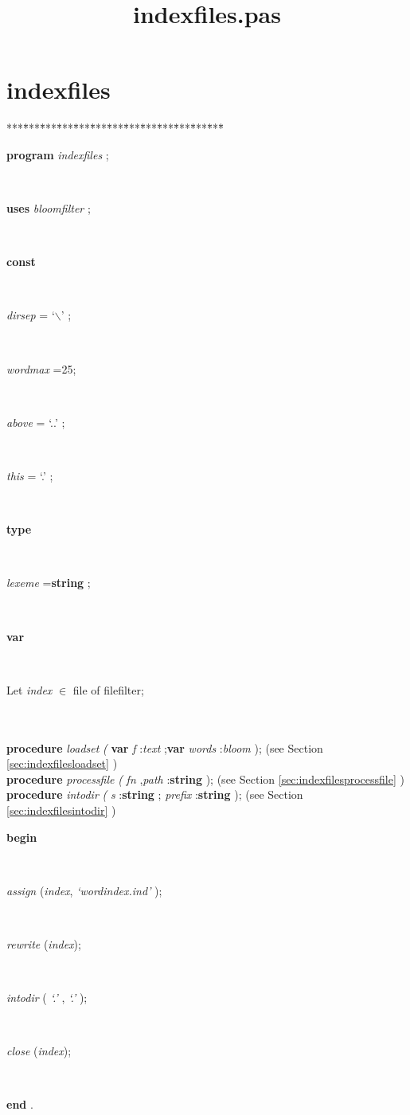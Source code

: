 \documentclass[10pt, a4paper]{article}
\title{indexfiles.pas}
\begin{document}
\maketitle

\tableofcontents
\section{indexfiles}
\begin{tabbing}
***\=***\=***\=***\=***\=***\=***\=***\=***\=***\=***\=***\=***\=\kill
\parbox{14cm}{\textsf{\textbf{program}  \textit{indexfiles} ;}}\\
\+\parbox{14cm}{\textsf{\textbf{uses}  \textit{bloomfilter} ;}}\\
\<\parbox{14cm}{\textsf{\textbf{const} }}\\
\parbox{14cm}{\textsf{\textit{dirsep} =\textrm{\textup { `$ \backslash $' } };}}\\
\parbox{14cm}{\textsf{\textit{wordmax} =25;}}\\
\parbox{14cm}{\textsf{\textit{above} =\textrm{\textup { `..' } };}}\\
\parbox{14cm}{\textsf{\textit{this} =\textrm{\textup { `.' } };}}\\
\<\parbox{14cm}{\textsf{\textbf{type} }}\\
\parbox{14cm}{\textsf{\textit{lexeme} =\textbf{string} ;}}\\
\<\parbox{14cm}{\textsf{\textbf{var} }}\\
\parbox{14cm}{\textsf{Let \textit{index} $\in$ file of filefilter;}}\\
\\
\<\textsf{\textbf{procedure}  \textit{loadset} \textit{(} \textbf{var}  \textit{f} :\textit{text} ;\textbf{var}  \textit{words} :\textit{bloom} );} (see Section \ref{sec:indexfilesloadset} )\\
\<\textsf{\textbf{procedure}  \textit{processfile} \textit{(} \textit{fn} ,\textit{path} :\textbf{string} );} (see Section \ref{sec:indexfilesprocessfile} )\\
\<\textsf{\textbf{procedure}  \textit{intodir} \textit{(} \textit{s} :\textbf{string} ; \textit{prefix} :\textbf{string} );} (see Section \ref{sec:indexfilesintodir} )\\
\-\<\+\parbox{14cm}{\textsf{\textbf{begin} }}\\
\parbox{14cm}{\textsf{\textit{assign} (\textit{index}, \textit{\textrm{\textup { `wordindex.ind' } }})}; }\\
\parbox{14cm}{\textsf{\textit{rewrite} (\textit{index})}; }\\
\parbox{14cm}{\textsf{\textit{intodir} (\textit{\textrm{\textup { `.' } }}, \textit{\textrm{\textup { `.' } }})}; }\\
\parbox{14cm}{\textsf{\textit{close} (\textit{index})}; }\\
\<\-\parbox{14cm}{\textsf{\textbf{end} .}}\\
\end{tabbing}
\end{document}
